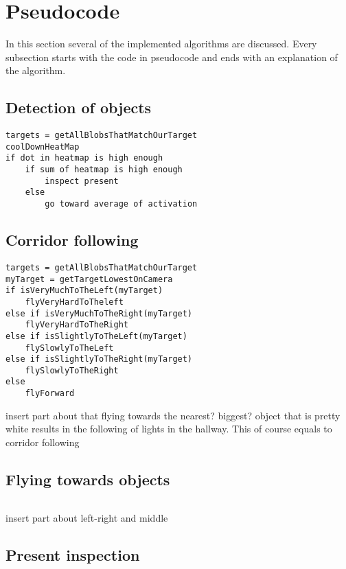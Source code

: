 \documentclass[a4paper,10pt]{article}
\begin{document}


\section{Pseudocode}
In this section several of the implemented algorithms are discussed. Every subsection starts with the code in pseudocode and ends with an explanation of the algorithm. 
\subsection{Detection of objects}
\begin{verbatim}
targets = getAllBlobsThatMatchOurTarget
coolDownHeatMap
if dot in heatmap is high enough
	if sum of heatmap is high enough
		inspect present
	else
		go toward average of activation

\end{verbatim}
\subsection{Corridor following} 
\begin{verbatim}
targets = getAllBlobsThatMatchOurTarget
myTarget = getTargetLowestOnCamera
if isVeryMuchToTheLeft(myTarget)
	flyVeryHardToTheleft
else if isVeryMuchToTheRight(myTarget)
	flyVeryHardToTheRight
else if isSlightlyToTheLeft(myTarget)
	flySlowlyToTheLeft
else if isSlightlyToTheRight(myTarget)
	flySlowlyToTheRight
else
	flyForward

\end{verbatim}

insert part about that flying towards the nearest? biggest? object that is pretty white results in the following of lights in the hallway. This of course equals to corridor following


\subsection{Flying towards objects}
\begin{verbatim}

\end{verbatim}

insert part about left-right and middle 

\subsection{Present inspection}
\begin{verbatim}

\end{verbatim}
\end{document}
